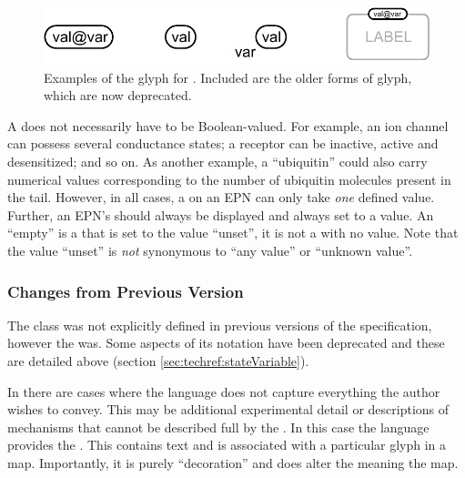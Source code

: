 \begin{figure}[htb]
  \centering
  \includegraphics[width=\textwidth]{images/stateVariable}
  \caption{Examples of the \PD glyph for . Included are the older forms of glyph, which are now deprecated.}
  \label{fig:techref:state-var}
\end{figure}

A  does not necessarily have to be
Boolean-valued.  For example, an ion channel can possess several
conductance states; a receptor can be inactive, active and
desensitized; and so on.  As another example, a 
``ubiquitin'' could also carry numerical values corresponding to the
number of ubiquitin molecules present in the tail.  However, in all
cases, a  on an EPN can only take \emph{one}
defined value.  Further, an EPN's  should always
be displayed and always set to a value.  An ``empty''  is a  that is set to the value
``unset'', it is not a  with no value. Note that
the value ``unset'' is \emph{not} synonymous to ``any value'' or
``unknown value''.


\subsubsection{Changes from Previous Version}

The  class was not explicitly defined in
previous versions of the specification, however the  was. Some aspects of its notation have been deprecated and
these are detailed above (section \ref{sec:techref:stateVariable}).

\label{defn:Annotation}

In \SBGNPDLone there are cases where the language does not capture
everything the author wishes to convey. This may be additional
experimental detail or descriptions of mechanisms that cannot be
described full by the \PDl. In this case the language provides the
. This contains text and is associated with a
particular glyph in a map. Importantly, it is purely ``decoration''
and does alter the meaning the map.


